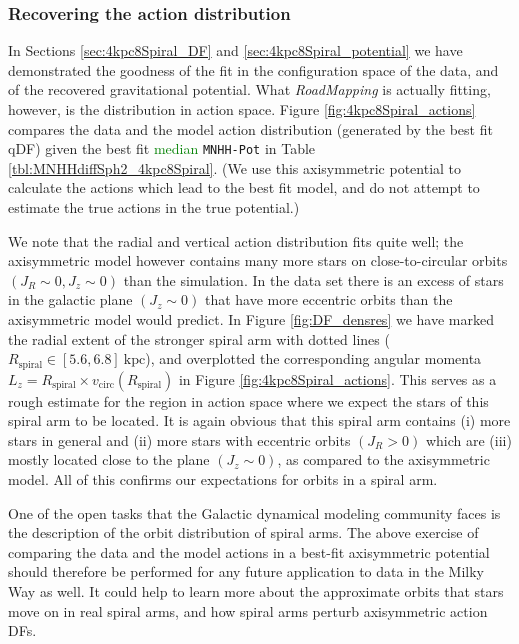 \documentclass[iop,revtex4,numberedappendix,appendixfloats]{emulateapj}
\newcommand{\RM}{{\sl RoadMapping}}
\newcommand{\NEW}[1]{\textcolor{Green}{#1}}
\begin{document}
\subsubsection{Recovering the action distribution} \label{sec:4kpc8Spiral_actions}

In Sections \ref{sec:4kpc8Spiral_DF} and \ref{sec:4kpc8Spiral_potential} we have demonstrated the goodness of the fit in the configuration space of the data, and of the recovered gravitational potential. What \RM{} is actually fitting, however, is the distribution in action space. Figure \ref{fig:4kpc8Spiral_actions} compares the data and the model action distribution (generated by the best fit qDF) given the best fit \NEW{median} \texttt{MNHH-Pot} in Table \ref{tbl:MNHHdiffSph2_4kpc8Spiral}. (We use this axisymmetric potential to calculate the actions which lead to the best fit model, and do not attempt to estimate the true actions in the true potential.)

We note that the radial and vertical action distribution fits quite well; the axisymmetric model however contains many more stars on close-to-circular orbits $(J_R \sim 0,J_z \sim 0)$ than the simulation. In the data set there is an excess of stars in the galactic plane $(J_z\sim0)$ that have more eccentric orbits  than the axisymmetric model would predict. In Figure \ref{fig:DF_densres} we have marked the radial extent of the stronger spiral arm with dotted lines ($R_\text{spiral} \in [5.6,6.8]~\text{kpc}$), and overplotted the corresponding angular momenta $L_z = R_\text{spiral} \times v_\text{circ}(R_\text{spiral})$ in Figure \ref{fig:4kpc8Spiral_actions}. This serves as a rough estimate for the region in action space where we expect the stars of this spiral arm to be located. It is again obvious that this spiral arm contains (i) more stars in general and (ii) more stars with eccentric orbits  $(J_R>0)$ which are (iii) mostly located close to the plane $(J_z\sim0)$, as compared to the axisymmetric model. All of this confirms our expectations for orbits in a spiral arm. 

One of the open tasks that the Galactic dynamical modeling community faces is the description of the orbit distribution of spiral arms. The above exercise of comparing the data and the model actions in a best-fit axisymmetric potential should therefore be performed for any future application to data in the Milky Way as well. It could help to learn more about the approximate orbits that stars move on in real spiral arms, and how spiral arms perturb axisymmetric action DFs.
\end{document}
